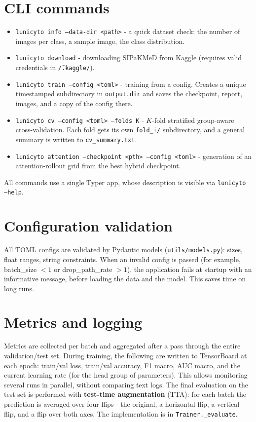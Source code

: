 \documentclass[14pt,a4paper]{extreport}
\begin{document}
\section{CLI commands}

\begin{itemize}
    \item \texttt{lunicyto info --data-dir <path>} - a quick dataset
          check: the number of images per class, a sample image, the
          class distribution.
    \item \texttt{lunicyto download} - downloading SIPaKMeD from Kaggle
          (requires valid credentials in \texttt{\~/.kaggle/}).
    \item \texttt{lunicyto train --config <toml>} - training from a
          config. Creates a unique timestamped subdirectory in
          \texttt{output.dir} and saves the checkpoint, report, images,
          and a copy of the config there.
    \item \texttt{lunicyto cv --config <toml> --folds K} - $K$-fold
          stratified group-aware cross-validation. Each fold gets its
          own \texttt{fold\_i/} subdirectory, and a general summary is
          written to \texttt{cv\_summary.txt}.
    \item \texttt{lunicyto attention --checkpoint <pth> --config <toml>}
          - generation of an attention-rollout grid from the best hybrid
          checkpoint.
\end{itemize}

All commands use a single Typer app, whose description is visible via
\texttt{lunicyto --help}.

\section{Configuration validation}

All TOML configs are validated by Pydantic models
(\texttt{utils/models.py}): sizes, float ranges, string constraints.
When an invalid config is passed (for example, batch\_size $< 1$ or
drop\_path\_rate $> 1$), the application fails at startup with an
informative message, before loading the data and the model. This saves
time on long runs.

\section{Metrics and logging}

Metrics are collected per batch and aggregated after a pass through the
entire validation/test set. During training, the following are written
to TensorBoard at each epoch: train/val loss, train/val accuracy, F1
macro, AUC macro, and the current learning rate (for the head group of
parameters). This allows monitoring several runs in parallel, without
comparing text logs. The final evaluation on the test set is performed
with \textbf{test-time augmentation} (TTA): for each batch the
prediction is averaged over four flips - the original, a horizontal
flip, a vertical flip, and a flip over both axes. The implementation is
in \texttt{Trainer.\_evaluate}.
\end{document}
